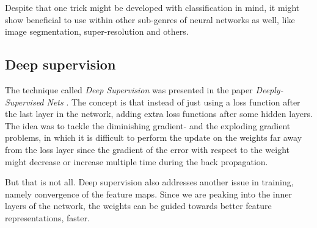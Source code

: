 Despite that one trick might be developed with classification in mind, it might show beneficial to use within other sub-genres of neural networks as well, like image segmentation, super-resolution and others. 

\subsection{Deep supervision}
The technique called \emph{Deep Supervision} was presented in the paper \emph{Deeply-Supervised Nets} \citep{Deep-supervision}. The concept is that instead of just using a loss function after the last layer in the network, adding extra loss functions after some hidden layers. The idea was to tackle the diminishing gradient- and the exploding gradient problems, in which it is difficult to perform the update on the weights far away from the loss layer since the gradient of the error with respect to the weight might decrease or increase multiple time during the back propagation. 

But that is not all. Deep supervision also addresses another issue in training, namely convergence of the feature maps. Since we are peaking into the inner layers of the network, the weights can be guided towards better feature representations, faster. 


















